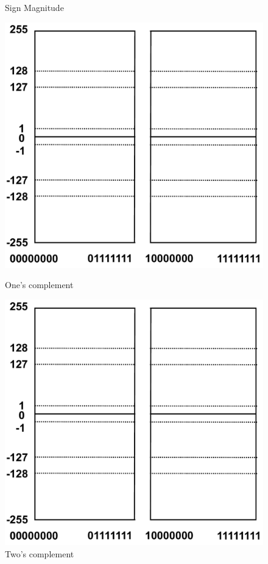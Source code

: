 \documentclass[addpoints, 12pt, answers]{exam}
\begin{document}
\begin{questions}
\begin{parts}
\begin{figure}[h]
\begin{minipage}[t]{0.35\textwidth}
        \caption*{Sign Magnitude}
        \end{minipage}  
        \hfill
        \begin{minipage}[t]{0.35\textwidth}
        \includegraphics[width=\linewidth]{number.pdf}
        \caption*{One's complement}
        \end{minipage}
        \hfill
        \begin{minipage}[t]{0.35\textwidth}
        \includegraphics[width=\linewidth]{number.pdf}
        \caption*{Two's complement}
        \end{minipage}  
    \end{figure}
    

\end{parts}
\end{questions}
\end{document}

